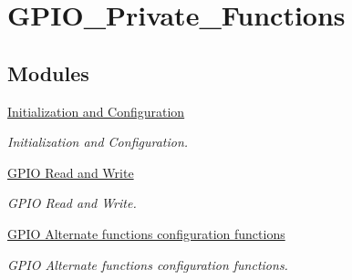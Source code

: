 \hypertarget{group___g_p_i_o___private___functions}{\section{G\-P\-I\-O\-\_\-\-Private\-\_\-\-Functions}
\label{group___g_p_i_o___private___functions}
}
\subsection*{Modules}
\begin{DoxyCompactItemize}
\item 
\hyperlink{group___g_p_i_o___group1}{Initialization and Configuration}
\begin{DoxyCompactList}\small\item\em Initialization and Configuration. \end{DoxyCompactList}\item 
\hyperlink{group___g_p_i_o___group2}{G\-P\-I\-O Read and Write}
\begin{DoxyCompactList}\small\item\em G\-P\-I\-O Read and Write. \end{DoxyCompactList}\item 
\hyperlink{group___g_p_i_o___group3}{G\-P\-I\-O Alternate functions configuration functions}
\begin{DoxyCompactList}\small\item\em G\-P\-I\-O Alternate functions configuration functions. \end{DoxyCompactList}\end{DoxyCompactItemize}
